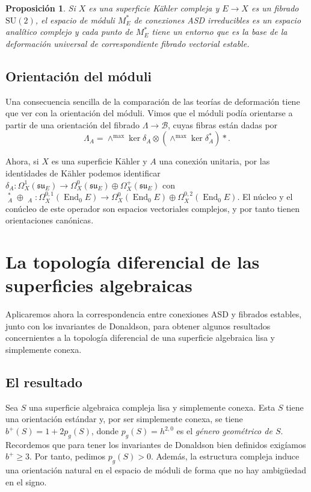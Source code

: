\documentclass[12pt, a4paper]{amsart}
\newcommand\su{\mathfrak{su}}
\DeclareMathOperator\End{End}
\DeclareMathOperator\delbar{\bar{\partial}}
\newtheorem{prop}[thm]{Proposición}
\theoremstyle{remark} \newtheorem{rmk}[thm]{Observación}
\theoremstyle{remark} \newtheorem{rmks}[thm]{Observaciones}
\theoremstyle{definition} \newtheorem{defn}[thm]{Definición}
\theoremstyle{definition} \newtheorem{ejs}[thm]{Ejemplos}
\theoremstyle{definition} \newtheorem{ej}[thm]{Ejemplo}
\begin{document}
\begin{prop}
	Si $X$ es una superficie Kähler compleja y $E\rightarrow X$ es un fibrado $\mathrm{SU}(2)$, el espacio de móduli $M_E^*$ de conexiones ASD irreducibles es un espacio analítico complejo y cada punto de $M_E^*$ tiene un entorno que es la base de la deformación universal de correspondiente fibrado vectorial estable.
	
\end{prop}

\subsection{Orientación del móduli}
Una consecuencia sencilla de la comparación de las teorías de deformación tiene que ver con la orientación del móduli. Vimos que el móduli podía orientarse a partir de una orientación del fibrado $\Lambda \rightarrow \mathcal{B}$, cuyas fibras están dadas por
\begin{equation*}
	\Lambda_A = \wedge^{\mathrm{max}}\ker \delta_A \otimes (\wedge^{\mathrm{max}}\ker \delta_A^*)*.
\end{equation*} 

Ahora, si $X$ es una superficie Kähler y $A$ una conexión unitaria, por las identidades de Kähler podemos identificar $\delta_A:\Omega^1_X(\su_E)\rightarrow \Omega^0_X(\su_E)\oplus \Omega^+_X(\su_E)$ con $\delbar_A^*\oplus \delbar_A: \Omega^{0,1}_X(\End_0 E)\rightarrow \Omega^0_X(\End_0 E)\oplus \Omega^{0,2}_X(\End_0 E)$. El núcleo y el conúcleo de este operador son espacios vectoriales complejos, y por tanto tienen orientaciones canónicas.

	\section{La topología diferencial de las superficies algebraicas}
	Aplicaremos ahora la correspondencia entre conexiones ASD y fibrados estables, junto con los invariantes de Donaldson, para obtener algunos resultados concernientes a la topología diferencial de una superficie algebraica lisa y simplemente conexa.

	\subsection{El resultado}
	Sea $S$ una superficie algebraica compleja lisa y simplemente conexa. Esta $S$ tiene una orientación estándar y, por ser simplemente conexa, se tiene $b^+(S)=1+2p_g(S)$, donde $p_g(S)=h^{2,0}$ es el \emph{género geométrico de $S$}. Recordemos que para tener los invariantes de Donaldson bien definidos exigíamos $b^+\geq 3$. Por tanto, pedimos $p_g(S)>0$. Además, la estructura compleja induce una orientación natural en el espacio de móduli de forma que no hay ambigüedad en el signo.
\end{document}
